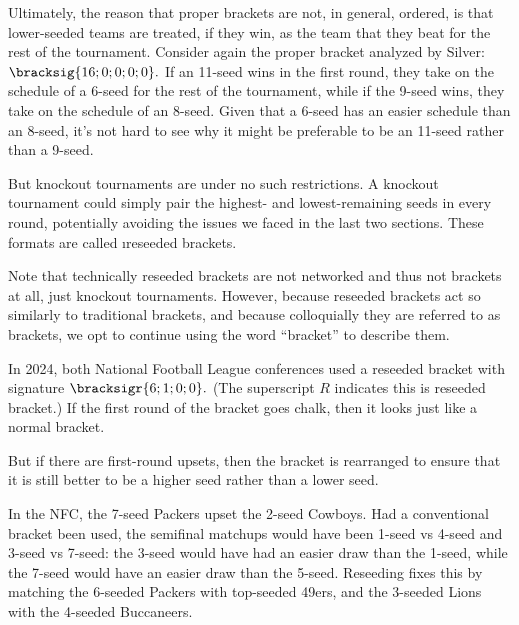 {    Ultimately, the reason that proper brackets are not, in general, ordered, is that lower-seeded teams are treated, if they win, as the team that they beat for the rest of the tournament. Consider again the proper bracket analyzed by Silver: $\bracksig{16; 0; 0; 0; 0}.$ If an 11-seed wins in the first round, they take on the schedule of a 6-seed for the rest of the tournament, while if the 9-seed wins, they take on the schedule of an 8-seed. Given that a 6-seed has an easier schedule than an 8-seed, it's not hard to see why it might be preferable to be an 11-seed rather than a 9-seed.

    But knockout tournaments are under no such restrictions. A knockout tournament could simply pair the highest- and lowest-remaining seeds in every round, potentially avoiding the issues we faced in the last two sections. These formats are called \i{reseeded brackets}.


    Note that technically reseeded brackets are not networked and thus not brackets at all, just knockout tournaments. However, because reseeded brackets act so similarly to traditional brackets, and because colloquially they are referred to as brackets, we opt to continue using the word ``bracket'' to describe them.

    In 2024, both National Football League conferences \cite{wiki_nfl} used a reseeded bracket with signature $\bracksigr{6; 1; 0; 0}.$ (The superscript $R$ indicates this is reseeded bracket.) If the first round of the bracket goes chalk, then it looks just like a normal bracket.


    But if there are first-round upsets, then the bracket is rearranged to ensure that it is still better to be a higher seed rather than a lower seed.


    In the NFC, the 7-seed Packers upset the 2-seed Cowboys. Had a conventional bracket been used, the semifinal matchups would have been 1-seed vs 4-seed and 3-seed vs 7-seed: the 3-seed would have had an easier draw than the 1-seed, while the 7-seed would have an easier draw than the 5-seed. Reseeding fixes this by matching the 6-seeded Packers with top-seeded 49ers, and the 3-seeded Lions with the 4-seeded Buccaneers.

}
